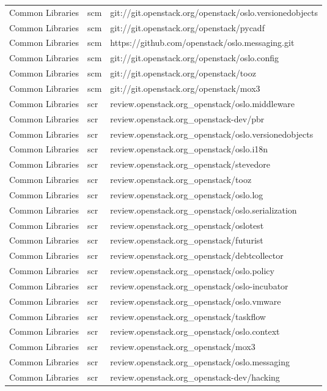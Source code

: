 \begin{center}
\begin{longtable}{|p{4cm}|p{1cm}|p{10cm}|}
Common Libraries&scm&git://git.openstack.org/openstack/oslo.versionedobjects\\ 
Common Libraries&scm&git://git.openstack.org/openstack/pycadf\\ 
Common Libraries&scm&https://github.com/openstack/oslo.messaging.git\\ 
Common Libraries&scm&git://git.openstack.org/openstack/oslo.config\\ 
Common Libraries&scm&git://git.openstack.org/openstack/tooz\\ 
Common Libraries&scm&git://git.openstack.org/openstack/mox3\\ 
Common Libraries&scr&review.openstack.org\_openstack/oslo.middleware\\ 
Common Libraries&scr&review.openstack.org\_openstack-dev/pbr\\ 
Common Libraries&scr&review.openstack.org\_openstack/oslo.versionedobjects\\ 
Common Libraries&scr&review.openstack.org\_openstack/oslo.i18n\\ 
Common Libraries&scr&review.openstack.org\_openstack/stevedore\\ 
Common Libraries&scr&review.openstack.org\_openstack/tooz\\ 
Common Libraries&scr&review.openstack.org\_openstack/oslo.log\\ 
Common Libraries&scr&review.openstack.org\_openstack/oslo.serialization\\ 
Common Libraries&scr&review.openstack.org\_openstack/oslotest\\ 
Common Libraries&scr&review.openstack.org\_openstack/futurist\\ 
Common Libraries&scr&review.openstack.org\_openstack/debtcollector\\ 
Common Libraries&scr&review.openstack.org\_openstack/oslo.policy\\ 
Common Libraries&scr&review.openstack.org\_openstack/oslo-incubator\\ 
Common Libraries&scr&review.openstack.org\_openstack/oslo.vmware\\ 
Common Libraries&scr&review.openstack.org\_openstack/taskflow\\ 
Common Libraries&scr&review.openstack.org\_openstack/oslo.context\\ 
Common Libraries&scr&review.openstack.org\_openstack/mox3\\ 
Common Libraries&scr&review.openstack.org\_openstack/oslo.messaging\\ 
Common Libraries&scr&review.openstack.org\_openstack-dev/hacking\\ 

\end{longtable}
\end{center}
